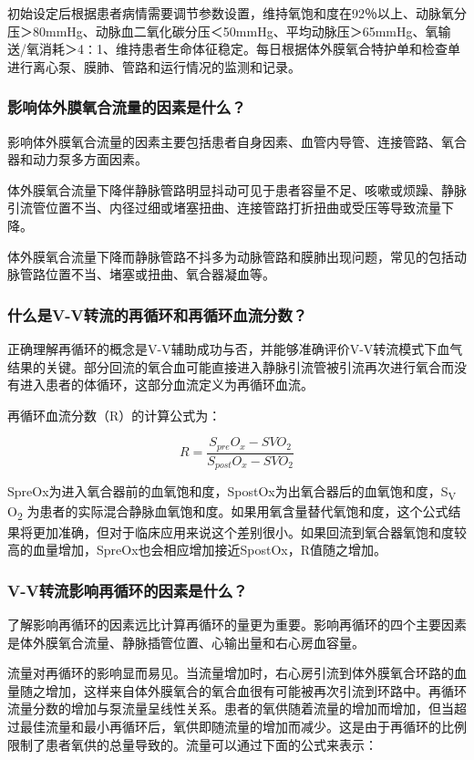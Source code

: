 初始设定后根据患者病情需要调节参数设置，维持氧饱和度在92％以上、动脉氧分压＞80mmHg、动脉血二氧化碳分压＜50mmHg、平均动脉压＞65mmHg、氧输送/氧消耗＞4∶1、维持患者生命体征稳定。每日根据体外膜氧合特护单和检查单进行离心泵、膜肺、管路和运行情况的监测和记录。

\subsubsection{影响体外膜氧合流量的因素是什么？}

影响体外膜氧合流量的因素主要包括患者自身因素、血管内导管、连接管路、氧合器和动力泵多方面因素。

体外膜氧合流量下降伴静脉管路明显抖动可见于患者容量不足、咳嗽或烦躁、静脉引流管位置不当、内径过细或堵塞扭曲、连接管路打折扭曲或受压等导致流量下降。

体外膜氧合流量下降而静脉管路不抖多为动脉管路和膜肺出现问题，常见的包括动脉管路位置不当、堵塞或扭曲、氧合器凝血等。

\subsubsection{什么是V-V转流的再循环和再循环血流分数？}

正确理解再循环的概念是V-V辅助成功与否，并能够准确评价V-V转流模式下血气结果的关键。部分回流的氧合血可能直接进入静脉引流管被引流再次进行氧合而没有进入患者的体循环，这部分血流定义为再循环血流。

再循环血流分数（R）的计算公式为：

\[R=\frac{S_{pre}O_x-SVO_2}{S_{post}O_x-SVO_2}\]

SpreOx为进入氧合器前的血氧饱和度，SpostOx为出氧合器后的血氧饱和度，S\textsubscript{V}
O\textsubscript{2}
为患者的实际混合静脉血氧饱和度。如果用氧含量替代氧饱和度，这个公式结果将更加准确，但对于临床应用来说这个差别很小。如果回流到氧合器氧饱和度较高的血量增加，SpreOx也会相应增加接近SpostOx，R值随之增加。

\subsubsection{V-V转流影响再循环的因素是什么？}

了解影响再循环的因素远比计算再循环的量更为重要。影响再循环的四个主要因素是体外膜氧合流量、静脉插管位置、心输出量和右心房血容量。

流量对再循环的影响显而易见。当流量增加时，右心房引流到体外膜氧合环路的血量随之增加，这样来自体外膜氧合的氧合血很有可能被再次引流到环路中。再循环流量分数的增加与泵流量呈线性关系。患者的氧供随着流量的增加而增加，但当超过最佳流量和最小再循环后，氧供即随流量的增加而减少。这是由于再循环的比例限制了患者氧供的总量导致的。流量可以通过下面的公式来表示：

